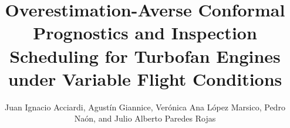 \documentclass[PHM]{PHMSociety}
\begin{document}
\title{Overestimation-Averse Conformal Prognostics and Inspection Scheduling for Turbofan Engines under Variable Flight Conditions}

\author{%
	Juan Ignacio Acciardi, Agust\'in Giannice, Ver\'onica Ana L\'opez Marsico, Pedro Na\'on, and Julio Alberto Paredes Rojas
}

\address{%
}

\maketitle

\end{document}
